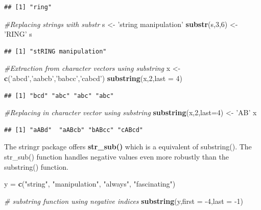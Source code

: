\documentclass[]{book}
\newenvironment{Shaded}{\begin{snugshade}}{\end{snugshade}}
\newcommand{\KeywordTok}[1]{\textcolor[rgb]{0.13,0.29,0.53}{\textbf{{#1}}}}
\newcommand{\DataTypeTok}[1]{\textcolor[rgb]{0.13,0.29,0.53}{{#1}}}
\newcommand{\DecValTok}[1]{\textcolor[rgb]{0.00,0.00,0.81}{{#1}}}
\newcommand{\StringTok}[1]{\textcolor[rgb]{0.31,0.60,0.02}{{#1}}}
\newcommand{\CommentTok}[1]{\textcolor[rgb]{0.56,0.35,0.01}{\textit{{#1}}}}
\newcommand{\NormalTok}[1]{{#1}}
\begin{document}
\begin{verbatim}
## [1] "ring"
\end{verbatim}

\begin{Shaded}
\begin{Highlighting}[]
\CommentTok{#Replacing strings with substr}
\NormalTok{s <-}\StringTok{ 'string manipulation'}
\KeywordTok{substr}\NormalTok{(s,}\DecValTok{3}\NormalTok{,}\DecValTok{6}\NormalTok{) <-}\StringTok{ 'RING'}
\NormalTok{s}
\end{Highlighting}
\end{Shaded}

\begin{verbatim}
## [1] "stRING manipulation"
\end{verbatim}

\begin{Shaded}
\begin{Highlighting}[]
\CommentTok{#Extraction from character vectors using substring}
\NormalTok{x <-}\StringTok{ }\KeywordTok{c}\NormalTok{(}\StringTok{'abcd'}\NormalTok{,}\StringTok{'aabcb'}\NormalTok{,}\StringTok{'babcc'}\NormalTok{,}\StringTok{'cabcd'}\NormalTok{)}
\KeywordTok{substring}\NormalTok{(x,}\DecValTok{2}\NormalTok{,}\DataTypeTok{last =} \DecValTok{4}\NormalTok{)}
\end{Highlighting}
\end{Shaded}

\begin{verbatim}
## [1] "bcd" "abc" "abc" "abc"
\end{verbatim}

\begin{Shaded}
\begin{Highlighting}[]
\CommentTok{#Replacing in character vector using substring}
\KeywordTok{substring}\NormalTok{(x,}\DecValTok{2}\NormalTok{,}\DataTypeTok{last=}\DecValTok{4}\NormalTok{) <-}\StringTok{ 'AB'}
\NormalTok{x}
\end{Highlighting}
\end{Shaded}

\begin{verbatim}
## [1] "aABd"  "aABcb" "bABcc" "cABcd"
\end{verbatim}

The stringr package offers \textbf{str\_sub()} which is a equivalent of
substring(). The str\_sub() function handles negative values even more
robustly than the substring() function.

\begin{Shaded}
\begin{Highlighting}[]
\NormalTok{y =}\StringTok{ }\KeywordTok{c}\NormalTok{(}\StringTok{"string"}\NormalTok{, }\StringTok{"manipulation"}\NormalTok{, }\StringTok{"always"}\NormalTok{, }\StringTok{"fascinating"}\NormalTok{)}

\CommentTok{# substring function using negative indices}
\KeywordTok{substring}\NormalTok{(y,}\DataTypeTok{first =} \NormalTok{-}\DecValTok{4}\NormalTok{,}\DataTypeTok{last =} \NormalTok{-}\DecValTok{1}\NormalTok{)}
\end{Highlighting}
\end{Shaded}
\end{document}
